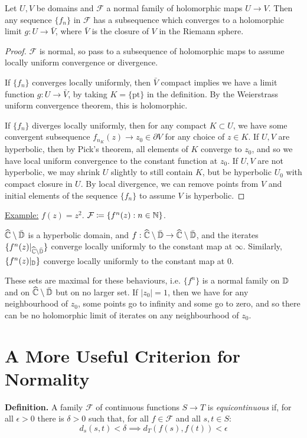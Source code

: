 \documentclass[10pt,a4paper]{article}
\begin{document}
\begin{lemma}
  Let $U, V$ be domains and $\mathcal{F}$ a normal family of holomorphic maps $U \to V$. Then any sequence $\{f_n\}$ in $\mathcal{F}$ has a subsequence which converges to a holomorphic limit $g: U \to \bar{V}$, where $\bar{V}$ is the closure of $V$ in the Riemann sphere.
\end{lemma}
\begin{proof}
  $\mathcal{F}$ is normal, so pass to a subsequence of holomorphic maps to assume locally uniform convergence or divergence.

  If $\{f_n\}$ converges locally uniformly, then $\bar{V}$ compact implies we have a limit function $g: U \to \bar{V}$, by taking $K = \{\text{pt}\}$ in the definition. By the Weierstrass uniform convergence theorem, this is holomorphic.

  If $\{f_n\}$ diverges locally uniformly, then for any compact $K \subset U$, we have some convergent subsequence $f_{n_K}(z) \to z_0 \in \partial V$ for any choice of $z \in K$. If $U, V$ are hyperbolic, then by Pick's theorem, all elements of $K$ converge to $z_0$, and so we have local uniform convergence to the constant function at $z_0$. If $U, V$ are not hyperbolic, we may shrink $U$ slightly to still contain $K$, but be hyperbolic $U_0$ with compact closure in $U$.
  By local divergence, we can remove points from $V$ and initial elements of the sequence $\{f_n\}$ to assume $V$ is hyperbolic.
\end{proof}

\underline{Example:} $f(z) = z^2$. $\mathcal{F} \coloneqq \{f^n(z) : n \in \mathbb{N}\}$.

$\widehat{\mathbb{C}} \setminus \bar{\mathbb{D}}$ is a hyperbolic domain, and $f:\widehat{\mathbb{C}}\setminus\bar{\mathbb{D}}\to\widehat{\mathbb{C}}\setminus\bar{\mathbb{D}}$, and the iterates $\{f^n(z)|_{\widehat{\mathbb{C}}\setminus\bar{\mathbb{D}}}\}$ converge locally uniformly to the constant map at $\infty$. Similarly, $\{f^n(z)|_{\mathbb{D}}\}$ converge locally uniformly to the constant map at 0.

These sets are maximal for these behaviours, i.e. $\{f^n\}$ is a normal family on $\mathbb{D}$ and on $\widehat{\mathbb{C}}\setminus\bar{\mathbb{D}}$ but on no larger set. If $|z_0| = 1$, then we have for any neighbourhood of $z_0$, some points go to infinity and some go to zero, and so there can be no holomorphic limit of iterates on any neighbourhood of $z_0$.

\section{A More Useful Criterion for Normality}
\textbf{Definition.} A family $\mathcal{F}$ of continuous functions $S \to T$ is \emph{equicontinuous} if, for all $\epsilon > 0$ there is $\delta >0$ such that, for all $f \in \mathcal{F}$ and all $s, t \in S$:
\[d_s(s,t) < \delta \implies d_T(f(s), f(t)) < \epsilon\]
\end{document}
